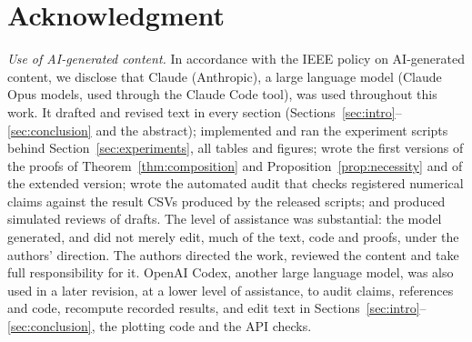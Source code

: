 \documentclass[conference]{IEEEtran}
\begin{document}
\section*{Acknowledgment}
\emph{Use of AI-generated content.} In accordance with the IEEE policy on
AI-generated content, we disclose that Claude (Anthropic), a large
language model (Claude Opus models, used through the Claude Code tool),
was used throughout this work. It drafted and revised text in every
section (Sections~\ref{sec:intro}--\ref{sec:conclusion} and the
abstract); implemented and ran the experiment scripts behind
Section~\ref{sec:experiments}, all tables and figures; wrote the first
versions of the proofs of Theorem~\ref{thm:composition} and
Proposition~\ref{prop:necessity} and of the extended version; wrote the
automated audit that checks registered numerical claims against the result CSVs produced by the released scripts; and produced simulated reviews of
drafts. The level of assistance was substantial: the model generated, and
did not merely edit, much of the text, code and proofs, under the authors'
direction. The authors directed the work, reviewed the content and take
full responsibility for it. OpenAI Codex, another large language model, was also used in a later revision, at a lower level of assistance, to audit claims, references and code, recompute recorded results, and edit text in Sections~\ref{sec:intro}--\ref{sec:conclusion}, the plotting code and the API checks.



\end{document}
